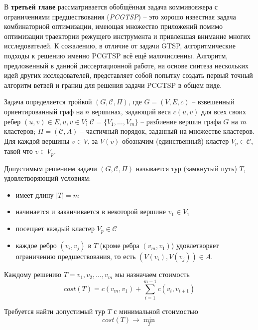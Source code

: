 
В {\bf третьей главе}
рассматривается обобщённая задача коммивояжера с
ограничениями предшествования ({\it PCGTSP}) --
это хорошо известная задача комбинаторной оптимизации,
имеющая множество приложений помимо
оптимизации траектории режущего инструмента
и привлекшая внимание многих исследователей.
К сожалению,
в отличие от задачи GTSP,
алгоритмические подходы к решению
именно PCGTSP всё ещё малочисленны.
Алгоритм, предложенный в данной диссертационной работе,
на основе синтеза нескольких идей других исследователей,
представляет собой попытку
создать первый точный алгоритм
ветвей и границ для
решения задачи PCGTSP в общем виде.

Задача определяется тройкой
$(G,\mathcal C,\Pi)$,
где
$G=(V,E,c)$ -- взвешенный ориентированный граф на $n$
вершинах,
задающий веса $c(u,v)$ для всех своих ребер
$(u,v)\in E, u, v \in V$;
$\mathcal C=\{V_1,\ldots,V_m\}$ -- разбиение вершин
графа $G$ на $m$ кластеров;
$ \Pi = (\mathcal C, A) $ -- частичный порядок,
заданный на множестве кластеров.
Для каждой вершины
$v\in V$, за $V(v)$
обозначим (единственный) кластер
$V_p\in\mathcal C$,
такой что
$v\in V_p$.

Допустимым решением задачи
$(G,\mathcal C,\Pi)$
называется тур (замкнутый путь) $T$,
удовлетворяющий условиям:
\begin{itemize}
    \item
    имеет длину $|T|=m$
    \item
    начинается и заканчивается в некоторой вершине $v_1\in V_1$
    \item
    посещает каждый кластер $V_p\in\mathcal C$
    \item
	каждое ребро
	$(v_i, v_j)$ в $T$
	(кроме ребра $(v_m,v_1)$)
	удовлетворяет ограничению предшествования,
	то есть
	 $(V(v_i),V(v_j))\in A$.
\end{itemize}

Каждому решению
$T=v_1, v_2, \ldots, v_m$
мы назначаем стоимость
\begin{equation}
    \label{eq:pctgsp-cost}
	cost(T) = c(v_m,v_1) + \sum_{i=1}^{m-1} c(v_i,v_{i+1})
\end{equation}

Требуется найти допустимый тур
$ T $
с минимальной стоимостью
$$
cost (T) \to \min_T
$$

